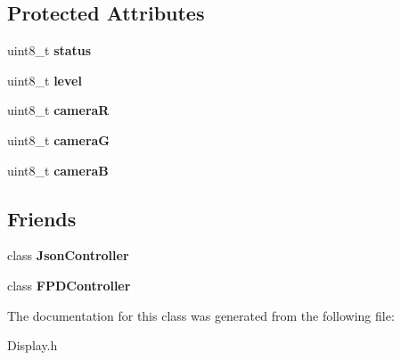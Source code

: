 \subsection*{Protected Attributes}
\begin{DoxyCompactItemize}
\item 
\hypertarget{classfirestep_1_1_display_acd4ec3ee696e5e44f6cd72b6e7f2b96d}{uint8\+\_\+t {\bfseries status}}\label{classfirestep_1_1_display_acd4ec3ee696e5e44f6cd72b6e7f2b96d}

\item 
\hypertarget{classfirestep_1_1_display_a66292a4fba836ad18de6ab228ddf8b6c}{uint8\+\_\+t {\bfseries level}}\label{classfirestep_1_1_display_a66292a4fba836ad18de6ab228ddf8b6c}

\item 
\hypertarget{classfirestep_1_1_display_ae50b9bb2a8f06e4d1411d1b4543901e4}{uint8\+\_\+t {\bfseries camera\+R}}\label{classfirestep_1_1_display_ae50b9bb2a8f06e4d1411d1b4543901e4}

\item 
\hypertarget{classfirestep_1_1_display_ae0293900c8a1dc8d0a8dd314c02df537}{uint8\+\_\+t {\bfseries camera\+G}}\label{classfirestep_1_1_display_ae0293900c8a1dc8d0a8dd314c02df537}

\item 
\hypertarget{classfirestep_1_1_display_af7d4b636ef027c155c281609a723858f}{uint8\+\_\+t {\bfseries camera\+B}}\label{classfirestep_1_1_display_af7d4b636ef027c155c281609a723858f}

\end{DoxyCompactItemize}
\subsection*{Friends}
\begin{DoxyCompactItemize}
\item 
\hypertarget{classfirestep_1_1_display_a63aca5b4b5947b26b23225194abc1e9c}{class {\bfseries Json\+Controller}}\label{classfirestep_1_1_display_a63aca5b4b5947b26b23225194abc1e9c}

\item 
\hypertarget{classfirestep_1_1_display_a62ce8176f96f110c5d95b6f4cb83bf1d}{class {\bfseries F\+P\+D\+Controller}}\label{classfirestep_1_1_display_a62ce8176f96f110c5d95b6f4cb83bf1d}

\end{DoxyCompactItemize}


The documentation for this class was generated from the following file\+:\begin{DoxyCompactItemize}
\item 
Display.\+h\end{DoxyCompactItemize}
